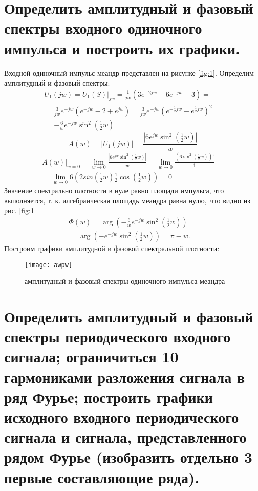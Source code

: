 \documentclass[a4paper,14pt ]{article} %
\begin{document}
    \section{Определить амплитудный и фазовый спектры входного одиночного импульса и построить их графики.}
    Входной одиночный импульс-меандр представлен на рисунке \ref{fig:1}.
    Определим амплитудный и фазовый спектры:
    \begin{multline}
        U_1(jw) = U_1(S)|_{jw} = \frac{1}{jw}\left(3e^{-2jw} - 6e^{-jw} + 3\right) = \\ 
         = \frac{3}{jw}e^{-jw}(e^{-jw} - 2 + e^{jw}) = 
         \frac{3}{jw}e^{-jw}\left(e^{-\frac{1}{2}jw} - e^{\frac12jw}\right)^2 = \\
         = -\frac{6}{w}e^{-jw}\sin^2\left(\frac12w\right)
    \end{multline} 
    \begin{equation}
        A(w) = \left| U_1(jw)\right| = 
        \frac{|6e^{jw}\sin^2\left(\frac12w\right)
        |}{w} 
    \end{equation}
    \begin{multline*}
        A(w)|_{w=0}=\lim\limits_{w \to 0}
        \frac{|6e^{jw}\sin^2\left(\frac12w\right)
        |}{w} = \lim\limits_{w \to 0}
        \frac{\left(6\sin^2\left(\frac12w\right)\right)'
        }{1} = \\
        = \lim\limits_{w \to 0}6\left(2sin\left(\frac12w\right)
        \frac12\cos\left(\frac12w\right)\right) = 0
    \end{multline*}
    \indent Значение спектрально плотности в нуле равно площади импульса, 
    что выполняется, т. к. алгебраическая площадь меандра равна нулю,\
    что видно из рис. \ref{fig:1}
    \begin{multline}
        \Phi(w) = \arg\left(
            -\frac{6}{w}e^{-jw}\sin^2\left(\frac12w\right)
            \right) = \\ = \arg\left(-e^{-jw}\sin^2\left(\frac12w\right)\right) = 
            \pi - w.
    \end{multline}
    \indent Построим графики амплитудной и фазовой спектральной плотности:
    \begin{figure}[H]
        \texttt{[image: awpw]}
        \centering
        \caption{амплитудный и фазовый спектры одиночного импульса-меандра}
        \label{fig:6}
    \end{figure}
    \newpage
    \section{Определить амплитудный и фазовый спектры периодического 
    входного сигнала;
     ограничиться 10 гармониками разложения сигнала в ряд Фурье; 
     построить графики исходного входного периодического сигнала и сигнала, представленного рядом Фурье 
    (изобразить отдельно 3 первые составляющие ряда).}
    
\end{document}
